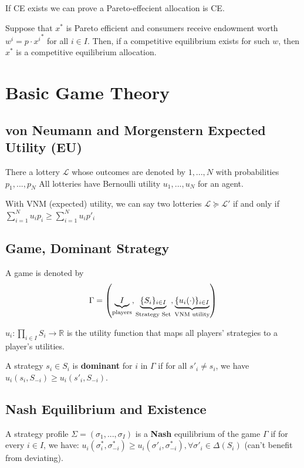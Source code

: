 \documentclass[11pt]{elegantbook}
\begin{document}
If CE exists we can prove a Pareto-effecient allocation is CE.
\begin{theorem}
    Suppose that $x^*$ is Pareto efficient and consumers receive endowment worth $w^i=p\cdot {x^i}^*$ for all $i\in I$. Then, if a competitive equilibrium exists for such $w$, then $x^*$ is a competitive equilibrium allocation.
\end{theorem}


\section{Basic Game Theory}
\subsection{von Neumann and Morgenstern Expected Utility (EU)}
\begin{definition}
\normalfont
    There a lottery $\mathcal{L}$ whose outcomes are denoted by $1,...,N$ with probabilities $p_1,...,p_N$ All lotteries have Bernoulli utility $u_1,...,u_N$ for an agent.

    With VNM (expected) utility, we can say two lotteries $\mathcal{L}\succeq \mathcal{L}'$ if and only if $\sum_{i=1}^N u_ip_i\geq \sum_{i=1}^N u_ip'_i$
\end{definition}

\subsection{Game, Dominant Strategy}
A game is denoted by $$\Gamma =\left(\underbrace{I}_{\textnormal{players}},\underbrace{\{S_i\}_{i\in I}}_{\textnormal{Strategy Set}},\underbrace{\{u_i(\cdot)\}_{i\in I}}_{\textnormal{VNM utility}}\right)$$

$u_i:\prod_{i\in I}S_i \rightarrow \mathbb{R}$ is the utility function that maps all players' strategies to a player's utilities.

\begin{definition}
    \normalfont
    A strategy $s_i\in S_i$ is \textbf{dominant} for $i$ in $\Gamma$ if for all $s'_i\neq s_i$, we have $u_i(s_i,S_{-i})\geq u_i(s'_i,S_{-i})$.
\end{definition}

\subsection{Nash Equilibrium and Existence}
\begin{definition}
    \normalfont
    A strategy profile $\Sigma=(\sigma_1,...,\sigma_I)$ is a \textbf{Nash} equilibrium of the game $\Gamma$ if for every $i\in I$, we have: $u_i(\sigma^*_i,\sigma^*_{-i})\geq u_i(\sigma'_i,\sigma^*_{-i}), \forall \sigma'_i\in \Delta(S_i)$ (can't benefit from deviating).
\end{definition}
\end{document}

